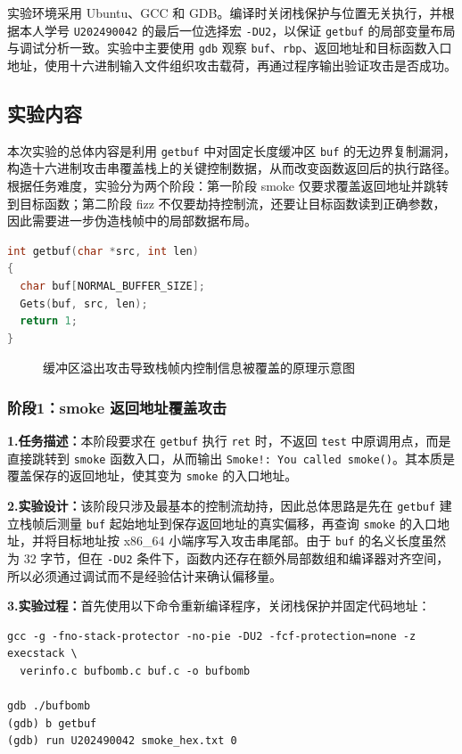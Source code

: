 \documentclass[supercite]{Experimental_Report}
\newcommand{\xfig}[3]{
  \begin{figure}[htb]
    \centering
    #3
    \caption{#2}
    \label{fig:#1}
  \end{figure}
}
\theoremstyle{definition}
\begin{document}
实验环境采用 Ubuntu、GCC 和 GDB。编译时关闭栈保护与位置无关执行，并根据本人学号 \texttt{U202490042} 的最后一位选择宏 \texttt{-DU2}，以保证 \texttt{getbuf} 的局部变量布局与调试分析一致。实验中主要使用 \texttt{gdb} 观察 \texttt{buf}、\texttt{rbp}、返回地址和目标函数入口地址，使用十六进制输入文件组织攻击载荷，再通过程序输出验证攻击是否成功。

\subsection{实验内容}
本次实验的总体内容是利用 \texttt{getbuf} 中对固定长度缓冲区 \texttt{buf} 的无边界复制漏洞，构造十六进制攻击串覆盖栈上的关键控制数据，从而改变函数返回后的执行路径。根据任务难度，实验分为两个阶段：第一阶段 smoke 仅要求覆盖返回地址并跳转到目标函数；第二阶段 fizz 不仅要劫持控制流，还要让目标函数读到正确参数，因此需要进一步伪造栈帧中的局部数据布局。

\begin{lstlisting}[language=C, caption={缓冲区溢出漏洞对应的关键代码}, label={lst:lab4-getbuf}]
int getbuf(char *src, int len)
{
  char buf[NORMAL_BUFFER_SIZE];
  Gets(buf, src, len);
  return 1;
}
\end{lstlisting}

\xfig{lab4-stack}{缓冲区溢出攻击导致栈帧内控制信息被覆盖的原理示意图}{\resizebox{0.9\textwidth}{!}{}}

\subsubsection{阶段1：smoke 返回地址覆盖攻击}
\noindent\textbf{1.任务描述：}本阶段要求在 \texttt{getbuf} 执行 \texttt{ret} 时，不返回 \texttt{test} 中原调用点，而是直接跳转到 \texttt{smoke} 函数入口，从而输出 \texttt{Smoke!: You called smoke()}。其本质是覆盖保存的返回地址，使其变为 \texttt{smoke} 的入口地址。

\noindent\textbf{2.实验设计：}该阶段只涉及最基本的控制流劫持，因此总体思路是先在 \texttt{getbuf} 建立栈帧后测量 \texttt{buf} 起始地址到保存返回地址的真实偏移，再查询 \texttt{smoke} 的入口地址，并将目标地址按 x86\_64 小端序写入攻击串尾部。由于 \texttt{buf} 的名义长度虽然为 32 字节，但在 \texttt{-DU2} 条件下，函数内还存在额外局部数组和编译器对齐空间，所以必须通过调试而不是经验估计来确认偏移量。

\noindent\textbf{3.实验过程：}首先使用以下命令重新编译程序，关闭栈保护并固定代码地址：

\begin{lstlisting}[language=Shell, caption={阶段1使用的编译与调试命令}, label={lst:lab4-smoke-cmd}]
gcc -g -fno-stack-protector -no-pie -DU2 -fcf-protection=none -z execstack \
  verinfo.c bufbomb.c buf.c -o bufbomb

gdb ./bufbomb
(gdb) b getbuf
(gdb) run U202490042 smoke_hex.txt 0
\end{lstlisting}
\end{document}
